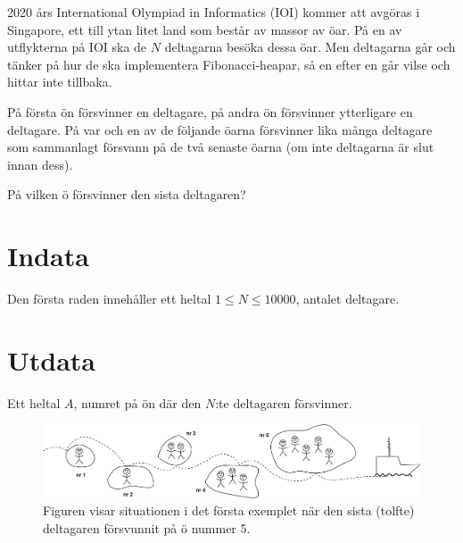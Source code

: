 2020 års International Olympiad in Informatics (IOI) kommer att avgöras i Singapore, ett till ytan litet land som består av massor av öar. På en av utflykterna på IOI ska de $N$ deltagarna besöka dessa öar. Men deltagarna går och tänker på hur de ska implementera Fibonacci-heapar, så en efter en går vilse och hittar inte tillbaka.

På första ön försvinner en deltagare, på andra ön försvinner ytterligare en deltagare. På var och en av de följande öarna försvinner lika många deltagare som sammanlagt försvann på de två senaste öarna (om inte deltagarna är slut innan dess).

På vilken ö försvinner den sista deltagaren?

\section*{Indata}
Den första raden innehåller ett heltal $1\le N \le 10000$, antalet deltagare.

\section*{Utdata}
Ett heltal $A$, numret på ön där den $N$:te deltagaren försvinner.

\begin{figure}[h]
  \centering
      \includegraphics[width=1.0\textwidth]{oarfig}
      \caption{Figuren visar situationen i det första exemplet när den sista (tolfte) deltagaren försvunnit på ö nummer 5.}
\end{figure}
